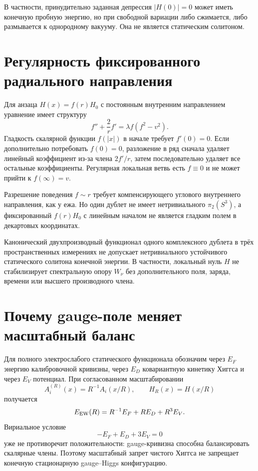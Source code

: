 В частности, принудительно заданная депрессия $|H(0)|=0$ может иметь
конечную пробную энергию, но при свободной вариации либо сжимается, либо
размывается к однородному вакууму. Она не является статическим солитоном.

\section{Регулярность фиксированного радиального направления}

Для анзаца $H(x)=f(r)H_0$ с постоянным внутренним направлением уравнение
имеет структуру
\begin{equation}
 f''+\frac2r f'=\lambda f(f^2-v^2).
 \label{eq:v6-higgs-radial-equation}
\end{equation}
Гладкость скалярной функции $f(|x|)$ в начале требует $f'(0)=0$.
Если дополнительно потребовать $f(0)=0$, разложение в ряд сначала удаляет
линейный коэффициент из-за члена $2f'/r$, затем последовательно удаляет
все остальные коэффициенты. Регулярная локальная ветвь есть $f\equiv0$ и
не может прийти к $f(\infty)=v$.

Разрешение поведения $f\sim r$ требует компенсирующего углового
внутреннего направления, как у ежа. Но один дублет не имеет
нетривиального $\pi_2(S^3)$, а фиксированный $f(r)H_0$ с линейным началом
не является гладким полем в декартовых координатах.

\begin{theorem}
Канонический двухпроизводный функционал одного комплексного дублета в
трёх пространственных измерениях не допускает нетривиального устойчивого
статического солитона конечной энергии. В частности, локальный нуль $H$
не стабилизирует спектральную опору $W_\nu$ без дополнительного поля,
заряда, времени или высшего производного члена.
\end{theorem}

\section{Почему gauge-поле меняет масштабный баланс}

Для полного электрослабого статического функционала обозначим через
$E_F$ энергию калибровочной кривизны, через $E_D$ ковариантную кинетику
Хиггса и через $E_V$ потенциал. При согласованном масштабировании
\begin{equation}
 A_i^{(R)}(x)=R^{-1}A_i(x/R),
 \qquad H_R(x)=H(x/R)
\end{equation}
получается
\begin{equation}
 E_{\rm EW}(R)=R^{-1}E_F+R E_D+R^3E_V.
 \label{eq:v6-electroweak-scaling}
\end{equation}
Вириальное условие
\begin{equation}
 -E_F+E_D+3E_V=0
 \label{eq:v6-electroweak-virial}
\end{equation}
уже не противоречит положительности: gauge-кривизна способна балансировать
скалярные члены. Поэтому масштабный запрет чистого Хиггса не запрещает
конечную стационарную gauge--Higgs конфигурацию.

